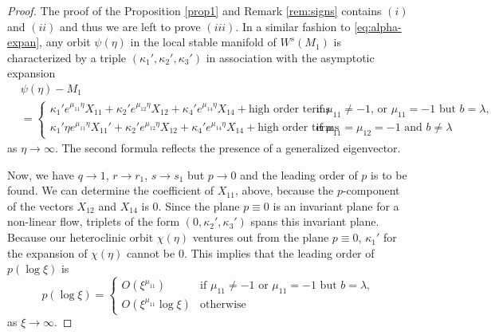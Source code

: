 \documentclass[11pt]{article}
\def\BO{{{O}}}
\theoremstyle{remark}
\begin{document}
\begin{proof}
The proof of the Proposition \ref{prop1} and Remark \ref{rem:signs} contains $(i)$ and $(ii)$ and thus we are left to prove $(iii)$. In a similar fashion to \eqref{eq:alpha-expan}, any orbit
$\psi(\eta)$ in the local stable manifold of $W^s(M_1)$ is characterized by a triple $(\kappa_1',\kappa_2',\kappa_3')$ in association with the asymptotic expansion
\begin{equation}
\begin{aligned}
 &\psi(\eta) -M_1\\
 &= \begin{cases} \kappa_1'e^{\mu_{11}\eta}X_{11} + \kappa_2'e^{\mu_{12}\eta}X_{12} + \kappa_4'e^{\mu_{14}\eta}X_{14} + \text{high order terms} & \text{if $\mu_{11}\ne-1$, or $\mu_{11}=-1$ but $b=\lambda$,}\\
 \kappa_1'\eta e^{\mu_{11}\eta}X_{11}' + \kappa_2'e^{\mu_{12}\eta}X_{12} + \kappa_4'e^{\mu_{14}\eta}X_{14} + \text{high order terms} & \text{if $\mu_{11}= \mu_{12} = -1$ and $b \ne \lambda$}
 \end{cases}
\end{aligned}
\end{equation}
as $\eta \rightarrow \infty$. The second formula reflects the presence of a generalized eigenvector.

Now, we have $q \rightarrow 1$, $r \rightarrow r_1$, $s \rightarrow s_1$ but $p \rightarrow 0$ and the leading order of $p$ is to be found. We can determine the coefficient
of $X_{11}$, above, because the $p$-component of the vectors $X_{12}$ and $X_{14}$ is $0$.
Since the plane $p\equiv0$ is an invariant plane for a non-linear flow, triplets of the form $(0,\kappa_2',\kappa_3')$ spans this invariant plane. Because our heteroclinic orbit $\chi(\eta)$ ventures out from the plane $p\equiv0$, $\kappa_1'$ for the expansion of $\chi(\eta)$ cannot be $0$.
This implies that the leading order of $p(\log\xi)$ is
$$p(\log\xi) = \begin{cases} \BO(\xi^{\mu_{11}}) & \text{if $\mu_{11}\ne-1$ or $\mu_{11}=-1$ but $b=\lambda$,}\\
 \BO(\xi^{\mu_{11}}\log\xi) & \text{otherwise}
 \end{cases}
 $$
as $\xi \rightarrow \infty$.


\end{proof}
\end{document}
